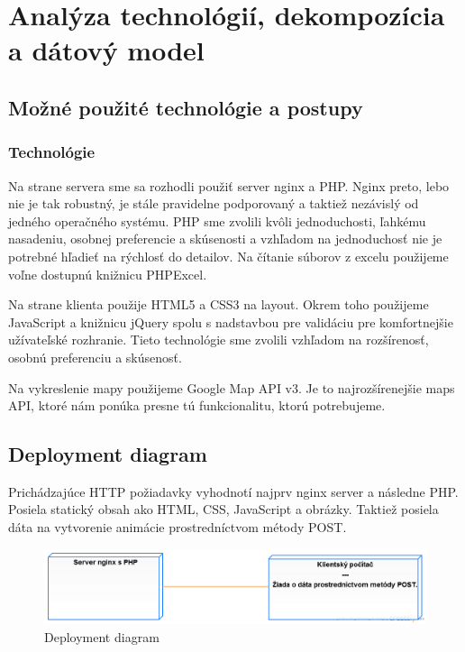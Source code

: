 \documentclass[12pt,a4paper]{report}
\begin{document}
\FloatBarrier

\renewcommand{\chaptername}{}	
\chapter[Analýza technológií, dekompozícia a dátový model]{\rmfamily\bfseries
	Analýza technológií, dekompozícia a dátový model}
	

\section[Možné použité technológie a postupy]{\rmfamily\bfseries
	Možné použité technológie a postupy}

\subsection[Technológie]{\rmfamily\bfseries
	Technológie}
Na strane servera sme sa rozhodli použiť server nginx a PHP. Nginx preto, lebo nie je tak robustný, je stále pravidelne podporovaný a taktiež nezávislý od jedného operačného systému. PHP sme zvolili kvôli jednoduchosti, ľahkému nasadeniu, osobnej preferencie a skúsenosti a vzhľadom na jednoduchosť nie je potrebné hľadieť na rýchlosť do detailov. Na čítanie súborov z excelu použijeme voľne dostupnú knižnicu PHPExcel.
\par
Na strane klienta použije HTML5 a CSS3 na layout. Okrem toho použijeme JavaScript a knižnicu jQuery spolu s nadstavbou pre validáciu pre komfortnejšie užívateľské rozhranie. Tieto technológie sme zvolili vzhľadom na rozšírenosť, osobnú preferenciu a skúsenosť. 
\par
Na vykreslenie mapy použijeme Google Map API v3. Je to najrozšírenejšie maps API, ktoré nám ponúka presne tú funkcionalitu, ktorú potrebujeme.
\pagebreak

\section[Deployment diagram]{\rmfamily\bfseries
	Deployment diagram}
Prichádzajúce HTTP požiadavky vyhodnotí najprv nginx server a následne PHP. Posiela statický obsah ako HTML, CSS, JavaScript a obrázky. Taktiež posiela dáta na vytvorenie animácie prostredníctvom métody POST.
\begin{figure}[htb]
\includegraphics[scale=0.5]{deployment}
\caption[Deployment diagram]{Deployment diagram}
 \label{fig:Deployment diagram}
\end{figure}
\end{document}
